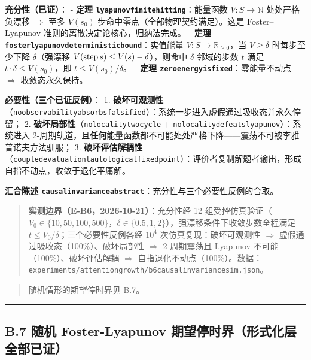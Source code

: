 \documentclass[
]{ctexart}
\renewcommand{\_}{\discretionary{}{}{\textunderscore}}
\renewcommand{\text}[1]{\textnormal{#1}}
\begin{document}
\textbf{充分性（已证）}： - \textbf{定理
\texttt{lyapunov\_finite\_hitting}}：能量函数 \(V : S \to \mathbb{N}\)
处处严格负漂移 \(\Rightarrow\) 至多 \(V(s_0)\)
步命中零点（全部物理契约满足）。这是 Foster--Lyapunov
准则的离散决定论核心，归纳法完成。 - \textbf{定理
\texttt{foster\_lyapunov\_deterministic\_bound}}：实值能量
\(V : S \to \mathbb{R}_{\ge 0}\)，当 \(V \ge \delta\) 时每步至少下降
\(\delta\)（强漂移 \(V(\text{step}\,s) \le V(s)-\delta\)），则命中
\(\delta\)-邻域的步数 \(t\) 满足 \(t \cdot \delta \le V(s_0)\)，即
\(t \le V(s_0)/\delta\)。 - \textbf{定理
\texttt{zero\_energy\_is\_fixed}}：零能量不动点 \(\Rightarrow\)
收敛态永久保持。

\textbf{必要性（三个已证反例）}： 1.
\textbf{破坏可观测性}（\texttt{no\_observability\_absorbs\_falsified}）：系统一步进入虚假通过吸收态并永久停留；
2. \textbf{破坏局部性}（\texttt{no\_locality\_two\_cycle} +
\texttt{no\_locality\_defeats\_lyapunov}）：系统进入
2-周期轨道，且\textbf{任何}能量函数都不可能处处严格下降------震荡不可被李雅普诺夫方法驯服；
3.
\textbf{破坏评估解耦性}（\texttt{coupled\_evaluation\_tautological\_fixed\_point}）：评价者复制解题者输出，形成自指不动点，收敛于退化平庸解。

\textbf{汇合陈述
\texttt{causal\_invariance\_abstract}}：充分性与三个必要性反例的合取。

\begin{quote}
\textbf{实测边界（E-B6，2026-10-21）}：充分性经 12
组受控仿真验证（\(V_0 \in \{10,50,100,500\}\)，\(\delta \in \{0.5,1,2\}\)），强漂移条件下收敛步数全程满足
\(t \le V_0/\delta\)；三个必要性反例各经 \(10^4\)
次仿真复现：破坏可观测性 \(\Rightarrow\)
虚假通过吸收态（100\%）、破坏局部性 \(\Rightarrow\) 2-周期震荡且
Lyapunov 不可能（100\%）、破坏评估解耦 \(\Rightarrow\)
自指退化不动点（100\%）。数据：\texttt{experiments/attention\_growth/b6\_causal\_invariance\_sim.json}。
\end{quote}

\begin{quote}
随机情形的期望停时界见 B.7。
\end{quote}

\begin{center}\rule{0.5\linewidth}{0.5pt}\end{center}

\subsection{B.7 随机 Foster-Lyapunov
期望停时界（形式化层全部已证）}\label{b.7-ux968fux673a-foster-lyapunov-ux671fux671bux505cux65f6ux754cux5f62ux5f0fux5316ux5c42ux5168ux90e8ux5df2ux8bc1}
\end{document}
